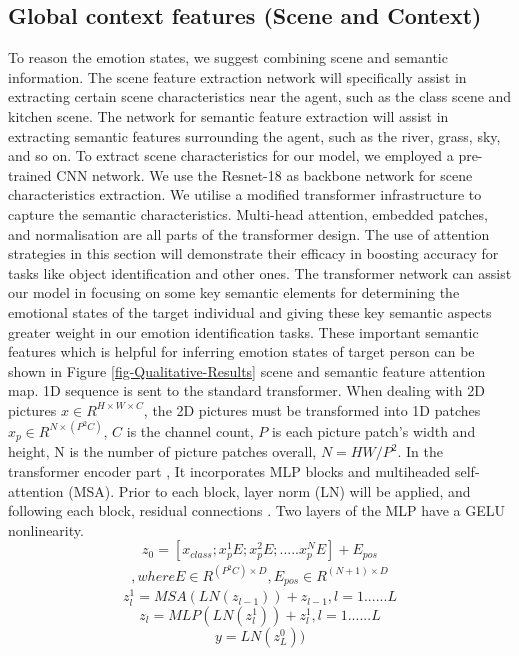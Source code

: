 \documentclass[conference]{IEEEtran}
\begin{document}
\subsection{Global context features (Scene and Context)}
To reason the emotion states, we suggest combining scene and semantic information. The scene feature extraction network will specifically assist in extracting certain scene characteristics near the agent, such as the class scene and kitchen scene. The network for semantic feature extraction will assist in extracting semantic features surrounding the agent, such as the river, grass, sky, and so on. To extract scene characteristics for our model, we employed a pre-trained CNN network. We use the Resnet-18 as backbone network for scene characteristics extraction. We utilise a modified transformer infrastructure  \cite{ref-29} to capture the semantic characteristics. Multi-head attention, embedded patches, and normalisation are all parts of the transformer design. The use of attention strategies in this section will demonstrate their efficacy in boosting accuracy for tasks like object identification and other ones. The transformer network can assist our model in focusing on some key semantic elements for determining the emotional states of the target individual and giving these key semantic aspects greater weight in our emotion identification tasks. These important semantic features which is helpful for inferring emotion states of target person can be shown in Figure \ref{fig-Qualitative-Results} scene and semantic feature attention map. 1D sequence is sent to the standard transformer. When dealing with 2D pictures $x \in R^{H\times W \times C}$, the 2D pictures must be transformed into 1D patches $x_p\in R^{N \times (P^2C)}$, $C$ is the channel count, $P$ is each picture patch's width and height, N is the number of picture patches overall, $N = HW/P^2$. In the transformer encoder part \cite{ref-46}, It incorporates MLP blocks and multiheaded self-attention (MSA). Prior to each block, layer norm (LN) will be applied, and following each block, residual connections \cite{ref-45}. Two layers of the MLP have a GELU nonlinearity.
\begin{equation}
z_0 = [x_{class}; x_{p}^{1}E;  x_{p}^{2}E;..... x_{p}^{N}E] +E_{pos}
\end{equation}
\begin{align*}
,where E\in{R^{(P^2 C)\times D}}, E_{pos} \in R^{(N+1)\times D}
\end{align*}
\begin{equation}
z_{l}^{1}= MSA (LN(z_{l-1}))+z_{l-1},  l= 1......L
\end{equation}
\begin{equation}
z_{l}= MLP(LN(z_{l}^{1}))+z_{l}^{1},  l= 1......L
\end{equation}
\begin{equation}
y= LN(z_{L}^{0})) 
\end{equation}
\end{document}
